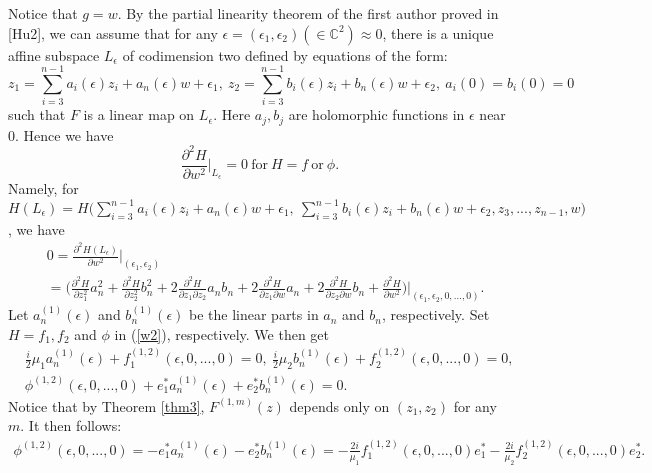 \documentclass[12pt]{article}
\numberwithin{equation}{section}
\def\p{\partial}
\begin{document}
\medskip
Notice that $g=w$.  By the partial linearity theorem of the first
author proved  in [Hu2], we can assume that for any
$\epsilon=(\epsilon_1,\epsilon_2)(\in \mathbb{C}^2)\approx 0$, there
is a unique affine subspace $L_\epsilon$ of codimension two  defined
by equations of the form:
\begin{equation}
  z_1=\sum\limits_{i=3}^{n-1}a_i(\epsilon)z_i+a_n(\epsilon)w+\epsilon_1,\
  z_2=\sum\limits_{i=3}^{n-1}b_i(\epsilon)z_i+b_n(\epsilon)w+\epsilon_2,\ a_i(0)=b_i(0)=0
\end{equation}
such that $F$ is a linear map on $L_{\epsilon}$. Here $a_j,b_j$ are
holomorphic functions in $\epsilon$ near $0$. Hence we have
$$
\frac{\p^2 H}{\p w^2}\Big|_{L_\epsilon}=0\ \text{for}\ H=f\
\text{or}\ \phi.
$$
Namely, for {$H(L_{\epsilon})=H\big(\sum^{n-1}_{i=3}a_i(\epsilon)z_i
+ a_n(\epsilon)w+\epsilon_1, \ \sum^{n-1}_{i=3}b_i(\epsilon)z_i +
b_n(\epsilon)w+\epsilon_2, z_3, ..., z_{n-1}, w\big)$}, we have {
\begin{equation}\begin{split}\label{w2}
 & 0=\frac{\p^2 H(L_{\epsilon})}{\p w^2}\Big|_{(\epsilon_1,\epsilon_2)}\\
 & =\Big(\frac{\p^2 H}{\p z_1^{2}}a_n^2+\frac{\p^2 H}{\p z_2^{2}}b_n^2
 + 2\frac{\p^2 H}{\p z_1 \p z_2}a_nb_n+2\frac{\p^2 H}{\p z_1\p w}a_n
 + 2\frac{\p^2 H}{\p z_2 \p w}b_n+\frac{\p^2 H}{\p w^{2}}\Big)
 \Big|_{(\epsilon_1,\epsilon_2, 0 ,..., 0)}.
 \end{split}
\end{equation}
}
Let $a_n^{(1)}(\epsilon)$ and $b_n^{(1)}(\epsilon)$ be the linear
parts in $a_n$ and $b_n$, respectively. Set $H=f_1,f_2$ and $\phi$
in (\ref{w2}), respectively. We then get
\begin{equation}\begin{split}
&\frac{i}{2}\mu_1a_n^{(1)}(\epsilon)+ f_1^{(1,2)}(\epsilon\text{{$,
0, ..., 0$}})=0,\
\frac{i}{2}\mu_2b_n^{(1)}(\epsilon)+ f_2^{(1,2)}(\epsilon\text{{$, 0, ..., 0$}})=0,\\
&\phi^{(1,2)}(\epsilon\text{{$, 0, ...,
0$}})+e^*_1a_n^{(1)}(\epsilon)+e^*_2b^{(1)}_n(\epsilon)=0.
\end{split}\end{equation}
Notice that by Theorem \ref{thm3}, $F^{(1,m)}(z)$ depends only on
$(z_1,z_2)$ for any $m$. It then follows:
\begin{equation}\begin{split}\label {eq1}
\phi^{(1,2)}(\epsilon\text{{$, 0, ...,
0$}})=-e_1^*a_n^{(1)}(\epsilon)-e_2^*b^{(1)}_n(\epsilon)
=-\frac{2i}{\mu_1}f_1^{(1,2)}(\epsilon\text{{$, 0, ...,
0$}})e^*_1-\frac{2i}{\mu_2}f_2^{(1,2)}(\epsilon\text{{$, 0, ...,
0$}})e_2^*.
\end{split}\end{equation}
\end{document}
